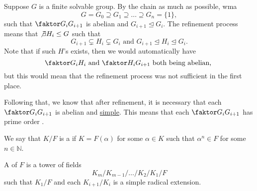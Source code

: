 \documentclass[notoc,notitlepage,nobib]{tufte-book}
\begin{document}
\begin{note}
  Suppose $G$ is a finite solvable group. By  
  the chain as much as possible, wma
  \begin{equation*}
    G = G_0 \supseteq G_1 \supseteq \hdots \supseteq G_n = \{1\},
  \end{equation*}
  such that $\quotient{G_i}{G_{i+1}}$ is abelian and $G_{i+1} \trianglelefteq
  G_i$. The refinement process means that $\not\exists H_i \leq G$ such that
  \begin{equation*}
    G_{i+1} \subsetneq H_i \subsetneq G_i \text{ and } G_{i+1} \trianglelefteq
    H_i \trianglelefteq G_i.
  \end{equation*}
  Note that if such $H$'s exists, then we would automatically have
  \begin{equation*}
    \quotient{G_i}{H_i} \text{ and } \quotient{H_i}{G_{i+1}} \text{ both being
    abelian, }
  \end{equation*}
  but this would mean that the refinement process was not sufficient in the
  first place.

  Following that, we know that after refinement, it is necessary that each
  $\quotient{G_i}{G_{i+1}}$ is abelian and
  \hyperref[defn:simple_extension_and_primitive_elements]{simple}. This means
  that each $\quotient{G_i}{G_{i+1}}$ has prime order .
\end{note}

\begin{defn}\label{defn:simple_radical_extension} 
  We say that $K / F$ is a  if $K = F(\alpha)$ 
  for some $\alpha \in K$ such that $\alpha^n \in F$ for some $n \in
  \mathbb{N}$.
\end{defn}

\begin{defn}\label{defn:radical_tower}
  A  of $F$ is a tower of fields
  \begin{equation}\label{eq:defn_radical_tower}
    K_m / K_{m-1} / \hdots / K_2 / K_1 / F
  \end{equation}
  such that $K_1 / F$ and each $K_{i+1} / K_i$ is a simple radical extension.
\end{defn}
\end{document}
